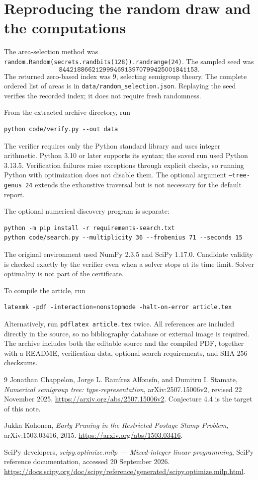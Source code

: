 \documentclass[11pt,letterpaper]{article}
\numberwithin{equation}{section}
\theoremstyle{definition}
\theoremstyle{remark}
\begin{document}
\section{Reproducing the random draw and the computations}\label{sec:reproduce}

The area-selection method was
\texttt{random.Random(secrets.randbits(128)).randrange(24)}. The sampled seed
was
\[
 \texttt{84421886621299946913970799425001841153}.
\]
The returned zero-based index was $9$, selecting semigroup theory. The
complete ordered list of areas is in \texttt{data/random\_selection.json}.
Replaying the seed verifies the recorded index; it does not require fresh
randomness.

From the extracted archive directory, run
\begin{lstlisting}
python code/verify.py --out data
\end{lstlisting}
The verifier requires only the Python standard library and uses integer
arithmetic. Python 3.10 or later supports its syntax; the saved run used
Python 3.13.5. Verification failures raise exceptions through explicit
checks, so running Python with optimization does not disable them.
The optional argument \texttt{--tree-genus 24} extends the exhaustive
traversal but is not necessary for the default report.

The optional numerical discovery program is separate:
\begin{lstlisting}
python -m pip install -r requirements-search.txt
python code/search.py --multiplicity 36 --frobenius 71 --seconds 15
\end{lstlisting}
The original environment used NumPy 2.3.5 and SciPy 1.17.0. Candidate validity
is checked exactly by the verifier even when a solver stops at its time
limit. Solver optimality is not part of the certificate.

To compile the article, run
\begin{lstlisting}
latexmk -pdf -interaction=nonstopmode -halt-on-error article.tex
\end{lstlisting}
Alternatively, run \texttt{pdflatex article.tex} twice. All references are
included directly in the source, so no bibliography database or external
image is required. The archive includes both the editable source and the
compiled PDF, together with a README, verification data, optional search
requirements, and SHA-256 checksums.

\begin{thebibliography}{9}
Jonathan Chappelon, Jorge L. Ram\'irez Alfons\'in, and Dumitru I. Stamate,
\emph{Numerical semigroup tree: type-representation},
arXiv:2507.15006v2, revised 22 November 2025.
\url{https://arxiv.org/abs/2507.15006v2}.
Conjecture 4.4 is the target of this note.

Jukka Kohonen,
\emph{Early Pruning in the Restricted Postage Stamp Problem},
arXiv:1503.03416, 2015.
\url{https://arxiv.org/abs/1503.03416}.

SciPy developers,
\emph{scipy.optimize.milp --- Mixed-integer linear programming},
SciPy reference documentation, accessed 20 September 2026.
\url{https://docs.scipy.org/doc/scipy/reference/generated/scipy.optimize.milp.html}.
\end{thebibliography}
\end{document}
